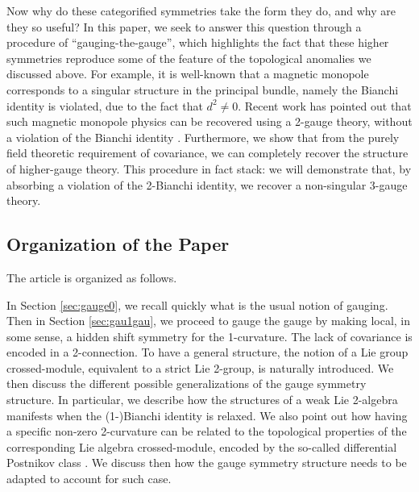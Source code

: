 \documentclass[onecolumn]{article}
\theoremstyle{theorem}
\theoremstyle{remark}
\theoremstyle{example}
\theoremstyle{definition}
\numberwithin{equation}{section}
\begin{document}
Now why do these categorified symmetries take the form they do, and why are they so useful?  In this paper, we seek to answer this question through a procedure of ``gauging-the-gauge'', which highlights  the fact that these higher symmetries reproduce some of the feature of the topological anomalies we discussed above. For example, it is well-known that a magnetic monopole corresponds to a singular structure in the principal bundle, namely the Bianchi identity is violated, due to the fact that $d^2\neq 0$. Recent work has pointed out that such magnetic monopole physics can be recovered using a 2-gauge theory, without a violation of the Bianchi identity \cite{Cordova:2018cvg,Benini_2019,Dubinkin:2020kxo}. Furthermore, we show that from the purely field theoretic requirement of covariance, we can completely recover the structure of higher-gauge theory. This procedure in fact stack: we will demonstrate that, by absorbing a violation of the 2-Bianchi identity, we recover a non-singular 3-gauge theory.



\subsection{Organization of the Paper}

The article is organized as follows. 

In Section \ref{sec:gauge0}, we recall quickly  what is the usual notion of gauging. Then in Section \ref{sec:gau1gau}, we proceed to gauge the gauge by making local, in some sense, a  hidden shift symmetry for the 1-curvature. The lack of covariance is encoded in a 2-connection. To have a general structure, the notion of a Lie group crossed-module, equivalent to a strict Lie 2-group, is naturally introduced. We then discuss the different possible generalizations of the gauge symmetry structure. In particular, we describe how the structures of a weak Lie 2-algebra \cite{Chen:2012gz,Baez:2003fs} manifests when the (1-)Bianchi identity is relaxed. We also point out how  having a specific non-zero 2-curvature can be related to the topological properties of the corresponding Lie algebra crossed-module, encoded by the so-called differential {{Postnikov class}} \cite{Baez:2005sn,Kapustin:2013uxa}. We discuss then how the gauge symmetry structure needs to be adapted to account for such case.    


\end{document}
